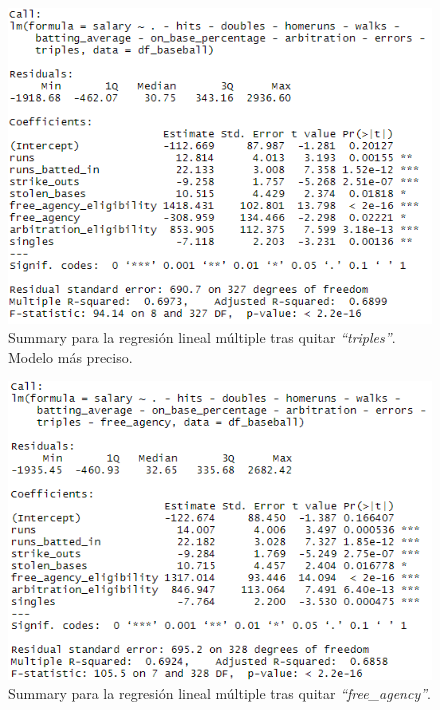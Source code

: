 \documentclass[a4paper,12pt, oneside]{book}
\begin{document}
\begin{figure}[H]
\centering
\includegraphics[scale=0.7]{images/multifit10.PNG}
\caption{Summary para la regresión lineal múltiple tras quitar \textit{``triples''}. Modelo más preciso.}
\end{figure}

\begin{figure}[H]
\centering
\includegraphics[scale=0.7]{images/multifit11.PNG}
\caption{Summary para la regresión lineal múltiple tras quitar \textit{``free\_agency''}.}
\end{figure}
\end{document}
